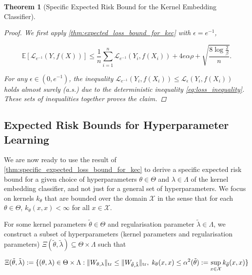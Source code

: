 \documentclass{article}
\newtheorem{theorem}{Theorem}[section]
\begin{document}
\begin{theorem}[Specific Expected Risk Bound for the Kernel Embedding Classifier]
\begin{proof}
				We first apply \cref{thm:expected_loss_bound_for_kec} with $\epsilon = e^{-1}$,
				
				\begin{equation}
					\mathbb{E}[\mathcal{L}_{e^{-1}}(Y, f(X))] \leq \frac{1}{n} \sum_{i = 1}^{n} \mathcal{L}_{e^{-1}}(Y_{i}, f(X_{i})) + 4 e \alpha \rho + \sqrt{\frac{8 \log{\frac{2}{\beta}}}{n}}.
				\end{equation}
				
				For any $\epsilon \in (0, e^{-1})$, the inequality $\mathcal{L}_{e^{-1}}(Y_{i}, f(X_{i})) \leq \mathcal{L}_{\epsilon}(Y_{i}, f(X_{i}))$ holds almost surely (a.s.) due to the deterministic inequality \eqref{eq:loss_inequality}. These sets of inequalities together proves the claim.
			\end{proof}
		\end{theorem}

	\subsection{Expected Risk Bounds for Hyperparameter Learning}
	\label{app:expected_risk_bounds_for_hyperparameter_learning}
	
		We are now ready to use the result of \cref{thm:specific_expected_loss_bound_for_kec} to derive a specific expected risk bound for a given choice of hyperparameters $\theta \in \Theta$ and $\lambda \in \Lambda$ of the kernel embedding classifier, and not just for a general set of hyperparameters. We focus on kernels $k_{\theta}$ that are bounded over the domain $\mathcal{X}$ in the sense that for each $\theta \in \Theta$, $k_{\theta}(x, x) < \infty$ for all $x \in \mathcal{X}$.
		
		For some kernel parameters $\tilde{\theta} \in \Theta$ and regularisation parameter $\tilde{\lambda} \in \Lambda$, we construct a subset of hyperparameters (kernel parameters and regularisation parameters) $\Xi(\tilde{\theta}, \tilde{\lambda}) \subseteq \Theta \times \Lambda$ such that

		\begin{equation}
			\Xi(\tilde{\theta}, \tilde{\lambda}) := \{ (\theta, \lambda) \in \Theta \times \Lambda : \| W_{\theta, \lambda} \|_{\mathrm{tr}} \leq \| W_{\tilde{\theta}, \tilde{\lambda}} \|_{\mathrm{tr}}, \; k_{\theta}(x, x) \leq \alpha^{2}(\tilde{\theta}) := \sup_{x \in \mathcal{X}} k_{\tilde{\theta}}(x, x) \} \\
			\label{eq:hyperparameter_subset_definition}
		\end{equation}
		
\end{document}
